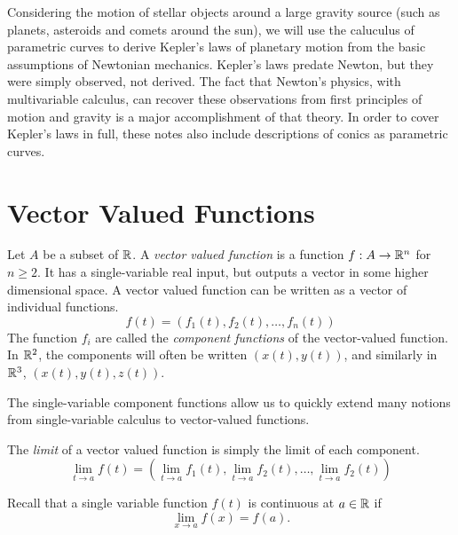 \documentclass[fleqn,letterpaper]{report}
\begin{document}
Considering the motion of stellar objects around a large
gravity source (such as planets, asteroids and comets around
the sun), we will use the caluculus of parametric curves to
derive Kepler's laws of planetary motion from the basic
assumptions of Newtonian mechanics. Kepler's laws predate
Newton, but they were simply observed, not derived. The fact
that Newton's physics, with multivariable calculus, can
recover these observations from first principles of motion and
gravity is a major accomplishment of that theory. In order to
cover Kepler's laws in full, these notes also include 
descriptions of conics as parametric curves.

\section{Vector Valued Functions}
\label{vector-valued-functions}

\begin{defn}
Let $A$ be a subset of $\mathbb{R}$. A \emph{vector valued function}
is a function $f: A \rightarrow \mathbb{R}^n$ for $n \geq 2$. It has
a single-variable real input, but outputs a vector in some
higher dimensional space. A vector valued function can be
written as a vector of individual functions.
\begin{equation*}
f(t) = (f_1(t), f_2(t), \ldots, f_n(t))
\end{equation*}
The function $f_i$ are called the \emph{component functions}
of the vector-valued function. In $\mathbb{R}^2$, the components
will often be written $(x(t), y(t))$, and similarly in $\mathbb{R}^3$,
$(x(t), y(t), z(t))$.
\end{defn}

The single-variable component functions allow us to quickly
extend many notions from single-variable calculus to
vector-valued functions.

\begin{defn}
The \emph{limit} of a vector valued function is simply the
limit of each component. 
\begin{equation*}
\lim_{t \rightarrow a} f(t) = \left( 
\lim_{t \rightarrow a} f_1 (t), 
\lim_{t \rightarrow a} f_2 (t), 
\ldots, 
\lim_{t \rightarrow a} f_2 (t) \right)
\end{equation*}
\end{defn}

Recall that a single variable function $f(t)$ is continuous at
$a \in \mathbb{R}$ if
\begin{equation*}
\lim_{x \rightarrow a} f(x) = f(a).
\end{equation*}
\end{document}
